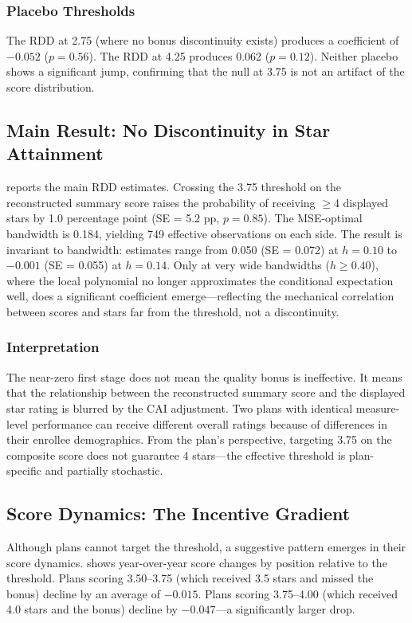 \documentclass[12pt]{article}
\begin{document}
\subsubsection*{Placebo Thresholds} The RDD at 2.75 (where no bonus discontinuity exists) produces a coefficient of $-0.052$ ($p = 0.56$). The RDD at 4.25 produces 0.062 ($p = 0.12$). Neither placebo shows a significant jump, confirming that the null at 3.75 is not an artifact of the score distribution.

\subsection{Main Result: No Discontinuity in Star Attainment}

 reports the main RDD estimates. Crossing the 3.75 threshold on the reconstructed summary score raises the probability of receiving $\geq$4 displayed stars by 1.0 percentage point (SE = 5.2 pp, $p = 0.85$). The MSE-optimal bandwidth is 0.184, yielding 749 effective observations on each side. The result is invariant to bandwidth: estimates range from 0.050 (SE = 0.072) at $h = 0.10$ to $-0.001$ (SE = 0.055) at $h = 0.14$. Only at very wide bandwidths ($h \geq 0.40$), where the local polynomial no longer approximates the conditional expectation well, does a significant coefficient emerge---reflecting the mechanical correlation between scores and stars far from the threshold, not a discontinuity.



\subsubsection*{Interpretation} The near-zero first stage does not mean the quality bonus is ineffective. It means that the relationship between the reconstructed summary score and the displayed star rating is blurred by the CAI adjustment. Two plans with identical measure-level performance can receive different overall ratings because of differences in their enrollee demographics. From the plan's perspective, targeting 3.75 on the composite score does not guarantee 4 stars---the effective threshold is plan-specific and partially stochastic.

\subsection{Score Dynamics: The Incentive Gradient}

Although plans cannot target the threshold, a suggestive pattern emerges in their score dynamics.  shows year-over-year score changes by position relative to the threshold. Plans scoring 3.50--3.75 (which received 3.5 stars and missed the bonus) decline by an average of $-0.015$. Plans scoring 3.75--4.00 (which received 4.0 stars and the bonus) decline by $-0.047$---a significantly larger drop.
\end{document}
